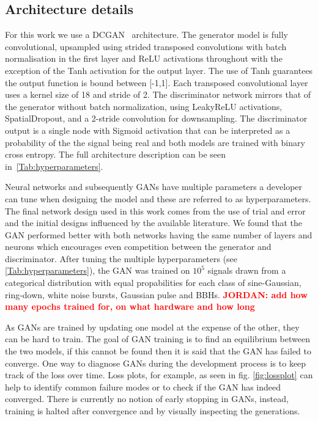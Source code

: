 \documentclass[12pt]{iopart}
\newcommand{\jordan}[1]{\textbf{\textcolor{red}{JORDAN: #1}}}
\begin{document}
\subsection{Architecture details}
%
%
For this work we use a \ac{DCGAN}~\cite{Radford2015} architecture. The generator model is fully convolutional,
upsampled using strided transposed convolutions
with batch normalisation in the
first layer and ReLU activations throughout with the exception of the Tanh activation for
the output layer. The use of Tanh guarantees the output function is bound between [-1,1]. Each transposed
convolutional layer uses a kernel size of 18 and stride of 2. The discriminator network
mirrors that of the generator without batch normalization, using
LeakyReLU activations, SpatialDropout, and a 2-stride convolution for
downsampling. The discriminator output is a single node with Sigmoid activation that can be interpreted as a probability of the the signal being real and both models are trained with binary cross
entropy. The full architecture description can be seen in~\cref{Tab:hyperparameters}.


%
Neural networks and subsequently \acp{GAN} have multiple parameters a developer
can tune when designing the model and these are referred to as hyperparameters.
The final network design used in this work comes from the use of trial and
error and the initial designs influenced by the available literature. We found
that the \ac{GAN} performed better with both networks having the same number of
layers and neurons which encourages even
competition between the generator and discriminator.  After tuning the multiple
hyperparameters (see \cref{Tab:hyperparameters}), the \ac{GAN} was trained on
$10^5$ signals  drawn from a categorical
distribution with equal propabilities for each class of
sine-Gaussian,
ring-down, white noise bursts, Gaussian pulse and \acp{BBH}. \jordan{add how many epochs trained for, on what hardware and how long}

As \acp{GAN} are trained by updating one model at the expense of the other, they can be hard to train. The goal of GAN training is to find an equilibrium between the two models, if this cannot be found then it is said that the \ac{GAN} has failed to converge. One way to diagnose \acp{GAN} during the development process is to keep track of the loss over time. Loss plots, for example, as seen in fig. \ref{fig:lossplot} can help to identify common failure modes or to check if the \ac{GAN} has indeed converged. There is currently no notion of early stopping in \acp{GAN}, instead, training is halted after convergence and by visually inspecting the generations. 
\end{document}
